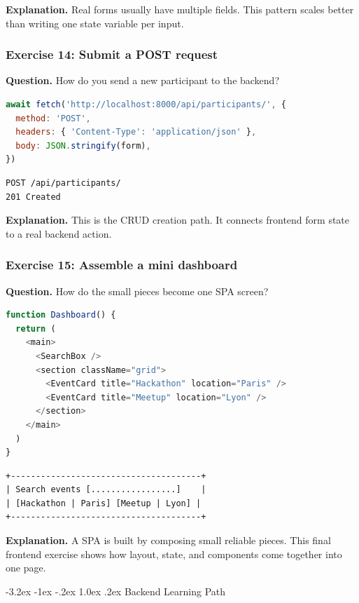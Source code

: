\documentclass[11pt,a4paper]{article}
\makeatletter
\renewcommand\section{\@startsection{section}{1}{\z@}%
  {-3.2ex \@plus -1ex \@minus -.2ex}%
  {1.0ex \@plus .2ex}%
  {\normalfont\Large\sffamily\bfseries\color{ink}}}
\makeatother
\begin{document}
\textbf{Explanation.} Real forms usually have multiple fields. This pattern scales better than writing one state variable per input.

\subsubsection*{Exercise 14: Submit a POST request}
\textbf{Question.} How do you send a new participant to the backend?

\begin{lstlisting}[style=code, language=JavaScript]
await fetch('http://localhost:8000/api/participants/', {
  method: 'POST',
  headers: { 'Content-Type': 'application/json' },
  body: JSON.stringify(form),
})
\end{lstlisting}

\begin{lstlisting}[style=terminal]
POST /api/participants/
201 Created
\end{lstlisting}

\textbf{Explanation.} This is the CRUD creation path. It connects frontend form state to a real backend action.

\subsubsection*{Exercise 15: Assemble a mini dashboard}
\textbf{Question.} How do the small pieces become one SPA screen?

\begin{lstlisting}[style=code, language=JavaScript]
function Dashboard() {
  return (
    <main>
      <SearchBox />
      <section className="grid">
        <EventCard title="Hackathon" location="Paris" />
        <EventCard title="Meetup" location="Lyon" />
      </section>
    </main>
  )
}
\end{lstlisting}

\begin{lstlisting}[style=terminal]
+--------------------------------------+
| Search events [.................]    |
| [Hackathon | Paris] [Meetup | Lyon] |
+--------------------------------------+
\end{lstlisting}

\textbf{Explanation.} A SPA is built by composing small reliable pieces. This final frontend exercise shows how layout, state, and components come together into one page.

\section{Backend Learning Path}
\end{document}
